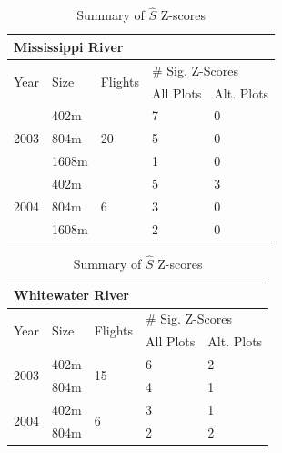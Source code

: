 \documentclass[12pt]{article}
\begin{document}
    \begin{table}
    \caption{Summary of \(\hat{S}\) Z-scores}
    \label{Z-scores}
    \begin{center}
    \begin{tabular}{|l|l|l|l|l|}
        \hline
        \multicolumn{5}{|l|}{\textbf{Mississippi River}} \\
        \hline
        \multirow{2}{*}{Year} & \multirow{2}{*}{Size} & \multirow{2}{*}{Flights}
        & \multicolumn{2}{|l|}{\# Sig. Z-Scores} \\
        \cline{4-5}
        & & & All Plots & Alt. Plots \\
        \hline
        \multirow{3}{*}{2003} & 402m & \multirow{3}{*}{20} & 7 & 0 \\
        \cline{2-2} \cline{4-5}
        & 804m & & 5 & 0 \\
        \cline{2-2} \cline{4-5}
        & 1608m & & 1 & 0 \\
        \hline
        \multirow{3}{*}{2004} & 402m & \multirow{3}{*}{6} & 5 & 3 \\
        \cline{2-2} \cline{4-5}
        & 804m & & 3 & 0 \\
        \cline{2-2} \cline{4-5}
        & 1608m & & 2 & 0 \\
        \hline
    \end{tabular}
    \end{center}

    \begin{center}
    \begin{tabular}{|l|l|l|l|l|}
        \hline
        \multicolumn{5}{|l|}{\textbf{Whitewater River}} \\
        \hline
        \multirow{2}{*}{Year} & \multirow{2}{*}{Size} & \multirow{2}{*}{Flights}
        & \multicolumn{2}{|l|}{\# Sig. Z-Scores} \\
        \cline{4-5}
        & & & All Plots & Alt. Plots \\
        \hline
        \multirow{2}{*}{2003} & 402m & \multirow{2}{*}{15} & 6 & 2 \\
        \cline{2-2} \cline{4-5}
        & 804m & & 4 & 1 \\
        \hline
        \multirow{2}{*}{2004} & 402m & \multirow{2}{*}{6} & 3 & 1 \\
        \cline{2-2} \cline{4-5}
        & 804m & & 2 & 2 \\
        \hline
    \end{tabular}
    \end{center}


\end{table}
\end{document}
